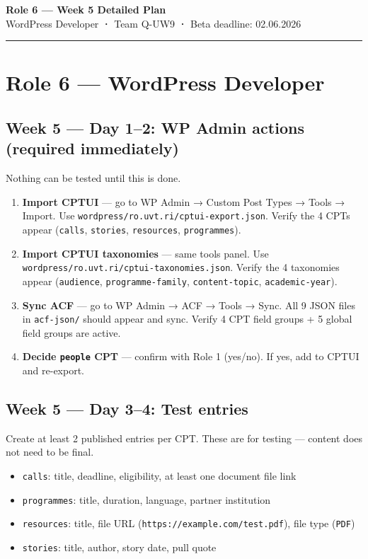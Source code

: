 \documentclass[11pt,a4paper]{article}
\begin{document}
\begin{center}
    {\Large\bfseries\color{uvtBlue} Role 6 — Week 5 Detailed Plan}\\[0.4em]
    {\small WordPress Developer \textbf{·} Team Q-UW9 \textbf{·} Beta deadline: 02.06.2026}
\end{center}
\vspace{0.3em}
\textcolor{uvtYellow}{\rule{\linewidth}{2pt}}
\vspace{0.8em}
\section{Role 6 — WordPress Developer}

\subsection{Week 5 — Day 1–2: WP Admin actions (required immediately)}

Nothing can be tested until this is done.

\begin{enumerate}
\item \textbf{Import CPTUI} — go to WP Admin → Custom Post Types → Tools → Import. Use \nolinkurl{wordpress/ro.uvt.ri/cptui-export.json}. Verify the 4 CPTs appear (\nolinkurl{calls}, \nolinkurl{stories}, \nolinkurl{resources}, \nolinkurl{programmes}).
\item \textbf{Import CPTUI taxonomies} — same tools panel. Use \nolinkurl{wordpress/ro.uvt.ri/cptui-taxonomies.json}. Verify the 4 taxonomies appear (\nolinkurl{audience}, \nolinkurl{programme-family}, \nolinkurl{content-topic}, \nolinkurl{academic-year}).
\item \textbf{Sync ACF} — go to WP Admin → ACF → Tools → Sync. All 9 JSON files in \nolinkurl{acf-json/} should appear and sync. Verify 4 CPT field groups + 5 global field groups are active.
\item \textbf{Decide \nolinkurl{people} CPT} — confirm with Role 1 (yes/no). If yes, add to CPTUI and re-export.
\end{enumerate}

\subsection{Week 5 — Day 3–4: Test entries}

Create at least 2 published entries per CPT. These are for testing — content does not need to be final.

\begin{itemize}
\item \nolinkurl{calls}: title, deadline, eligibility, at least one document file link
\item \nolinkurl{programmes}: title, duration, language, partner institution
\item \nolinkurl{resources}: title, file URL (\nolinkurl{https://example.com/test.pdf}), file type (\nolinkurl{PDF})
\item \nolinkurl{stories}: title, author, story date, pull quote
\end{itemize}
\end{document}
